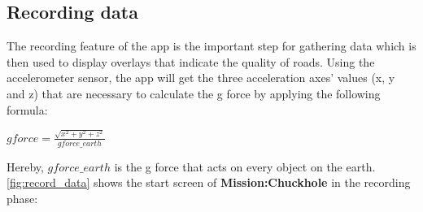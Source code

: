 \documentclass[10pt,a4paper]{article} %
\begin{document}
	
    

    \subsection{Recording data}
    	The recording feature of the app is the important step for gathering data which is then used to display overlays that indicate the quality of roads.
    	Using the accelerometer sensor, the app will get the three acceleration axes' values (x, y and z) that are necessary to calculate the g force by applying the following formula:

    
	\begin{center}
		$ gforce = \frac{\sqrt{x^2 + y^2 + z^2}}{gforce\_earth} $
	\end{center}
	\noindent
	Hereby, $gforce\_earth$ is the g force that acts on every object on the earth.\\
    	\autoref{fig:record_data} shows the start screen of \textbf{Mission:Chuckhole} in the recording phase:
\end{document}
